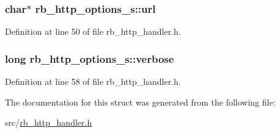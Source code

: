 \subsubsection[{url}]{\setlength{\rightskip}{0pt plus 5cm}char$\ast$ rb\+\_\+http\+\_\+options\+\_\+s\+::url}\label{structrb__http__options__s_a4ff0dbf74743aeea85f9c48ab51671cd}


Definition at line 50 of file rb\+\_\+http\+\_\+handler.\+h.

\hypertarget{structrb__http__options__s_adcb5506e74f7169825e080b19d1731a0}{}
\subsubsection[{verbose}]{\setlength{\rightskip}{0pt plus 5cm}long rb\+\_\+http\+\_\+options\+\_\+s\+::verbose}\label{structrb__http__options__s_adcb5506e74f7169825e080b19d1731a0}


Definition at line 58 of file rb\+\_\+http\+\_\+handler.\+h.



The documentation for this struct was generated from the following file\+:\begin{DoxyCompactItemize}
\item 
src/\hyperlink{rb__http__handler_8h}{rb\+\_\+http\+\_\+handler.\+h}\end{DoxyCompactItemize}
